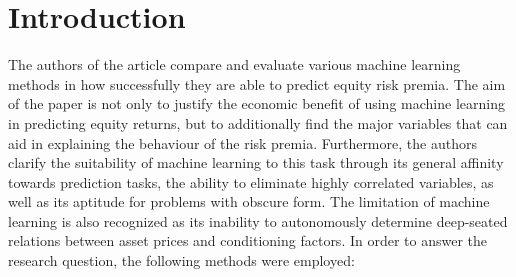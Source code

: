 \section{Introduction}

	The authors of the article compare and evaluate various machine learning methods
	in how successfully they are able to predict equity risk premia.
	The aim of the paper is not only to justify the economic benefit of using machine
	learning in predicting equity returns, but to additionally find the major variables
	that can aid in explaining the behaviour of the risk premia.
	Furthermore, the authors clarify the suitability of machine learning to this
	task through its general affinity towards prediction tasks,
	the ability to eliminate highly correlated variables,
	as well as its aptitude for problems with obscure form.
	The limitation of machine learning is also recognized as its inability
	to autonomously determine deep-seated relations between asset prices
	and conditioning factors. In order to answer the research question,
	the following methods were employed:
